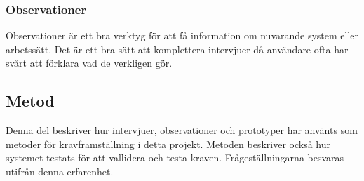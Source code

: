 \subsubsection{Observationer}
Observationer är ett bra verktyg för att få information om nuvarande system eller arbetssätt. Det är ett bra sätt att komplettera intervjuer då användare ofta har svårt att förklara vad de verkligen gör. \cite{Lauesen}
 
\subsection{Metod}
Denna del beskriver hur intervjuer, observationer och prototyper har använts som metoder för kravframställning i detta projekt. Metoden beskriver också hur systemet testats för att vallidera och testa kraven. Frågeställningarna besvaras utifrån denna erfarenhet.
